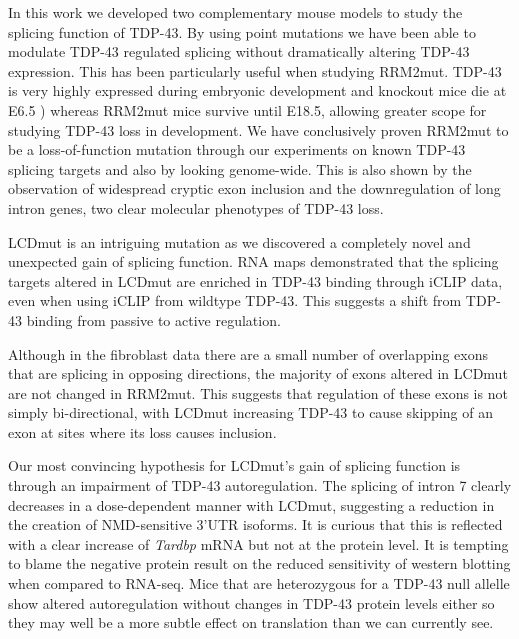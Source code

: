 In this work we developed two complementary mouse models to study the splicing function of TDP-43. 
By using point mutations we have been able to modulate TDP-43 regulated splicing without dramatically altering TDP-43 expression. 
This has been particularly useful when studying RRM2mut. 
TDP-43 is very highly expressed during embryonic development and knockout mice die at E6.5 \citep{Ricketts2014}) whereas RRM2mut mice survive until E18.5, allowing greater scope for studying TDP-43 loss in development.
We have conclusively proven RRM2mut to be a loss-of-function mutation through our experiments on known TDP-43 splicing targets and also by looking genome-wide. 
This is also shown by the observation of widespread cryptic exon inclusion and the downregulation of long intron genes, two clear molecular phenotypes of TDP-43 loss.

LCDmut is an intriguing mutation as we discovered a completely novel and unexpected gain of splicing function. 
RNA maps demonstrated that the splicing targets altered in LCDmut are enriched in TDP-43 binding through iCLIP data, even when using iCLIP from wildtype TDP-43. 
This suggests a shift from TDP-43 binding from passive to active regulation.

Although in the fibroblast data there are a small number of overlapping exons that are splicing in opposing directions, the majority of exons altered in LCDmut are not changed in RRM2mut. 
This suggests that regulation of these exons is not simply bi-directional, with LCDmut increasing TDP-43 to cause skipping of an exon at sites where its loss causes inclusion.

Our most convincing hypothesis for LCDmut's gain of splicing function is through an impairment of TDP-43 autoregulation. 
The splicing of intron 7 clearly decreases in a dose-dependent manner with LCDmut, suggesting a reduction in the creation of NMD-sensitive 3'UTR isoforms.
It is curious that this is reflected with a clear increase of \textit{Tardbp} mRNA but not at the protein level.
It is tempting to blame the negative protein result  on the reduced sensitivity of western blotting when compared to RNA-seq. 
Mice that are heterozygous for a TDP-43 null allelle show altered autoregulation without changes in TDP-43 protein levels either \citep{Ricketts2014} so they may well be a more subtle effect on translation than we can currently see.



